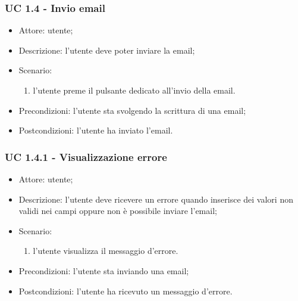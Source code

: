     \subsubsection{UC 1.4 - Invio email} \label{sec: UC 1.4}
    \begin{itemize}
        \item Attore: utente;
        \item Descrizione: l'utente deve poter inviare la email;
        \item Scenario:
        \begin{enumerate}
        \item l'utente preme il pulsante dedicato all'invio della email.
        \end{enumerate}
        \item Precondizioni: l'utente sta svolgendo la scrittura di una email;
        \item Postcondizioni: l'utente ha inviato l'email.
    \end{itemize}

    \subsubsection{UC 1.4.1 - Visualizzazione errore} \label{sec: UC 1.4.1}
    \begin{itemize}
        \item Attore: utente;
        \item Descrizione: l'utente deve ricevere un errore quando inserisce dei valori non validi nei campi oppure non è possibile inviare l'email;
        \item Scenario:
        \begin{enumerate}
        \item l'utente visualizza il messaggio d'errore.
        \end{enumerate}  
        \item Precondizioni: l'utente sta inviando una email;
        \item Postcondizioni: l'utente ha ricevuto un messaggio d'errore.
    \end{itemize}

